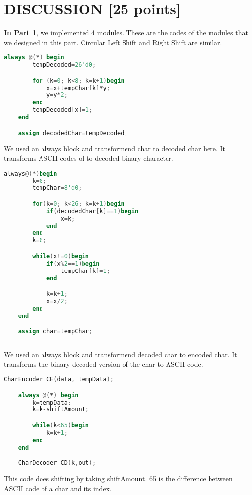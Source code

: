 \documentclass[pdftex,12pt,a4paper]{article}
\begin{document}
\section{DISCUSSION [25 points]}
\textbf{In Part 1}, we implemented 4 modules. These are the codes of the modules that we designed in this part. Circular Left Shift and Right Shift are similar. 

\begin{lstlisting}[language=Verilog, caption=CharDecoder]
    always @(*) begin
        tempDecoded=26'd0;

        for (k=0; k<8; k=k+1)begin
            x=x+tempChar[k]*y;
            y=y*2;
        end
        tempDecoded[x]=1;
    end

    assign decodedChar=tempDecoded;
\end{lstlisting}
We used an always block and transformend char to decoded char here. It transforms ASCII codes of to decoded binary character. \\


\begin{lstlisting}[language=Verilog, caption=CharEncoder]
 always@(*)begin
        k=0;
        tempChar=8'd0;

        for(k=0; k<26; k=k+1)begin
            if(decodedChar[k]==1)begin
                x=k;
            end
        end
        k=0;

        while(x!=0)begin
            if(x%2==1)begin
                tempChar[k]=1;
            end

            k=k+1;
            x=x/2;
        end
    end

    assign char=tempChar;
  
\end{lstlisting}
We used an always block and transformend decoded char to encoded char. It transforms the binary decoded version of the char to ASCII code.\\

\begin{lstlisting}[language=Verilog, caption=CircularRightShift]
 CharEncoder CE(data, tempData);

    always @(*) begin
        k=tempData;
        k=k-shiftAmount;

        while(k<65)begin
            k=k+1;
        end
    end

    CharDecoder CD(k,out);

\end{lstlisting}
This code does shifting by taking shiftAmount. 65 is the difference between ASCII code of a char and its index.\\
\end{document}
